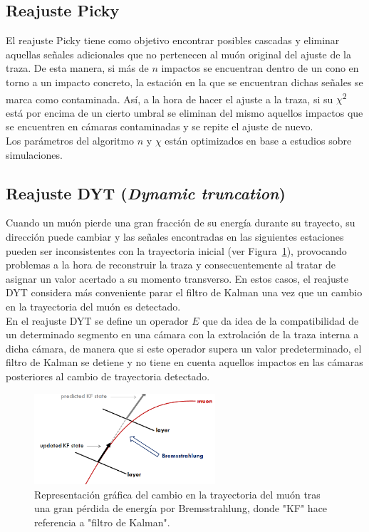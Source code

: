 \subsection{Reajuste Picky}\label{sec:Picky}

El reajuste Picky tiene como objetivo encontrar posibles cascadas y eliminar aquellas se\~nales adicionales que no pertenecen al mu\'on original del ajuste de la traza. De esta manera, si m\'as de $n$ impactos se encuentran dentro de un cono en torno a un impacto concreto, la estaci\'on en la que se encuentran dichas se\~nales se marca como contaminada. As\'i, a la hora de hacer el ajuste a la traza, si su $\chi$\textsuperscript{2} est\'a por encima de un cierto umbral se eliminan del mismo aquellos impactos que se encuentren en c\'amaras contaminadas y se repite el ajuste de nuevo. \\
Los par\'ametros del algoritmo $n$ y $\chi$ est\'an optimizados en base a estudios sobre simulaciones.

\subsection{Reajuste DYT (\textit{Dynamic truncation})}\label{sec:DYT}

Cuando un mu\'on pierde una gran fracci\'on de su energ\'ia durante su trayecto, su direcci\'on puede cambiar y las se\~nales encontradas en las siguientes estaciones pueden ser inconsistentes con la trayectoria inicial (ver Figura~\ref{fig:energyloss}), provocando problemas a la hora de reconstruir la traza y consecuentemente al tratar de asignar un valor acertado a su momento transverso. En estos casos, el reajuste DYT considera m\'as conveniente parar el filtro de Kalman una vez que un cambio en la trayectoria del mu\'on es detectado. \\
En el reajuste DYT se define un operador $E$ que da idea de la compatibilidad de un determinado segmento en una c\'amara con la extrolaci\'on de la traza interna a dicha c\'amara, de manera que si este operador supera un valor predeterminado, el filtro de Kalman se detiene y no tiene en cuenta aquellos impactos en las c\'amaras posteriores al cambio de trayectoria detectado. 

\begin{figure}[h]
\centering
\includegraphics[width=0.60\textwidth]{figures/energyloss.png}
\caption{Representaci\'on gr\'afica del cambio en la trayectoria del mu\'on tras una gran p\'erdida de energ\'ia por Bremsstrahlung, donde "KF" hace referencia a "filtro de Kalman".}
\label{fig:energyloss}        
\end{figure}


